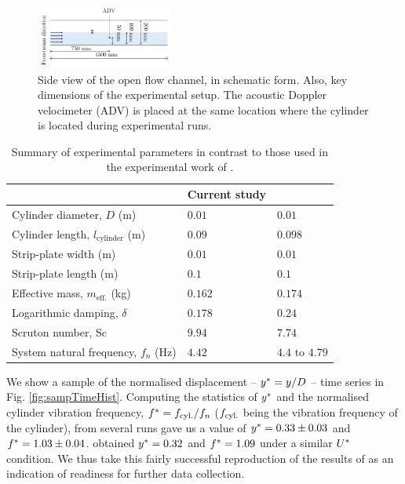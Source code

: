 \documentclass[a4paper,fleqn]{cas-sc}
\begin{document}
\begin{figure}
  \centering
  \includegraphics[width=0.4\textwidth]{figs/figure4}
  \caption{Side view of the open flow channel, in schematic form. Also, key dimensions of the experimental setup. The acoustic Doppler velocimeter (ADV) is placed at the same location where the cylinder is located during experimental runs.}
  \label{fig:keyDimensions}
\end{figure}

\begin{table}[width=0.9\linewidth,cols=3,pos=h]
  \caption{Summary of experimental parameters in contrast to those used in the experimental work of \citet{Koide2013}.} \label{tab:expParameter}
\begin{tabular*}{\tblwidth}{@{} LLL@{} }
\toprule
                                           & Current study & \citet{Koide2013}\\
\midrule
Cylinder diameter, $D$ (m)                 & $0.01$        & $0.01$           \\
Cylinder length, $l_{\text{cylinder}}$ (m) & $0.09$        & $0.098$          \\
Strip-plate width (m)                      & $0.01$        & $0.01$           \\
Strip-plate length (m)                     & $0.1$         & $0.1$            \\
Effective mass, $m_{\text{eff.}}$ (kg)     & $0.162$       & $0.174$          \\
Logarithmic damping, $\delta$              & $0.178$       & $0.24$           \\
Scruton number, Sc                         & $9.94$        & $7.74$           \\
System natural frequency, $f_{n}$ (Hz)     & $4.42$        & $4.4$ to $4.79$  \\
\bottomrule
\end{tabular*}
\end{table}

We show a sample of the normalised displacement -- $y^{*} = y/D$ -- time series in Fig. \ref{fig:sampTimeHist}. Computing the statistics of $y^{*}$ and the normalised cylinder vibration frequency, $f^{*} = f_{\text{cyl.}}/f_{n}$ ($f_{\text{cyl.}}$ being the vibration frequency of the cylinder), from several runs gave us a value of $y^{*} = 0.33 \pm 0.03$ and $f^{*} = 1.03 \pm 0.04$. \citet{Koide2013} obtained $y^{*} = 0.32$  and $f^{*} = 1.09$ under a similar $U^{*}$ condition. We thus take this fairly successful reproduction of the results of \citet{Koide2013} as an indication of readiness for further data collection.
\end{document}
